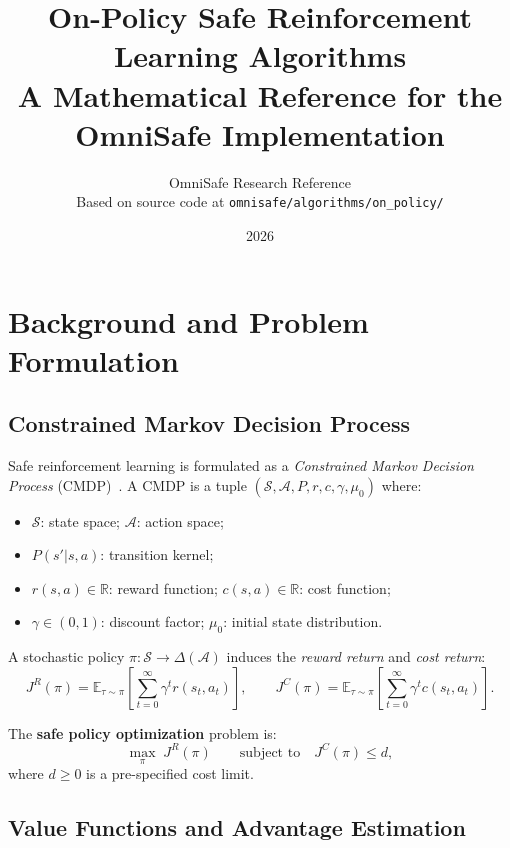 \documentclass[12pt,a4paper]{article}
\title{%
  \textbf{On-Policy Safe Reinforcement Learning Algorithms}\\[0.5em]
  \large A Mathematical Reference for the OmniSafe Implementation
}
\author{%
  OmniSafe Research Reference\\
  \small Based on source code at \texttt{omnisafe/algorithms/on\_policy/}
}
\date{2026}
\theoremstyle{definition}
\newcommand{\E}{\mathbb{E}}
\newcommand{\R}{\mathbb{R}}
\begin{document}
\maketitle
\tableofcontents
\newpage

\section{Background and Problem Formulation}
\label{sec:background}

\subsection{Constrained Markov Decision Process}

Safe reinforcement learning is formulated as a \emph{Constrained Markov Decision Process}
(CMDP)~\citep{altman1999constrained}. A CMDP is a tuple
$(\mathcal{S}, \mathcal{A}, P, r, c, \gamma, \mu_0)$ where:

\begin{itemize}[nosep]
  \item $\mathcal{S}$: state space; $\mathcal{A}$: action space;
  \item $P(s'|s,a)$: transition kernel;
  \item $r(s,a) \in \R$: reward function; $c(s,a) \in \R$: cost function;
  \item $\gamma \in (0,1)$: discount factor; $\mu_0$: initial state distribution.
\end{itemize}

A stochastic policy $\pi : \mathcal{S} \to \Delta(\mathcal{A})$ induces the
\emph{reward return} and \emph{cost return}:
\begin{equation}
  J^R(\pi) = \E_{\tau \sim \pi}\!\left[\sum_{t=0}^{\infty} \gamma^t r(s_t, a_t)\right],
  \qquad
  J^C(\pi) = \E_{\tau \sim \pi}\!\left[\sum_{t=0}^{\infty} \gamma^t c(s_t, a_t)\right].
\end{equation}

The \textbf{safe policy optimization} problem is:
\begin{equation}
  \label{eq:cmdp}
  \max_{\pi} \; J^R(\pi) \qquad \text{subject to} \quad J^C(\pi) \leq d,
\end{equation}
where $d \geq 0$ is a pre-specified cost limit.

\subsection{Value Functions and Advantage Estimation}
\end{document}
